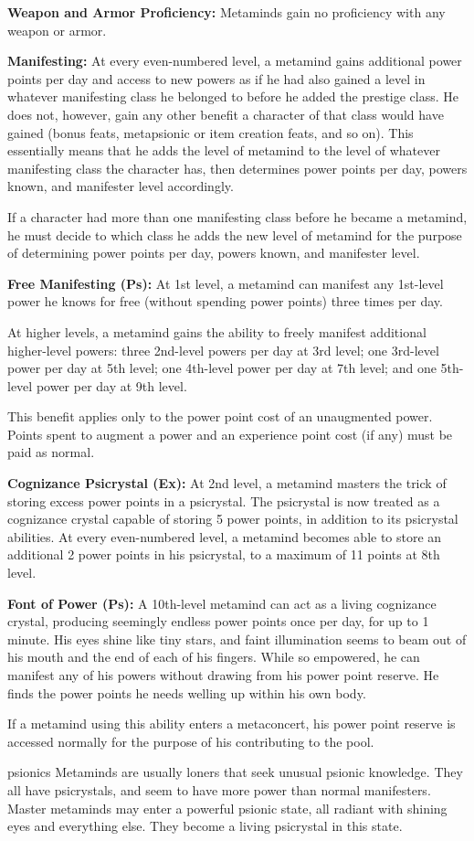 {
\textbf{Weapon and Armor Proficiency:} Metaminds gain no proficiency with any weapon or armor.

\textbf{Manifesting:} At every even-numbered level, a metamind gains additional power points per day and access to new powers as if he had also gained a level in whatever manifesting class he belonged to before he added the prestige class. He does not, however, gain any other benefit a character of that class would have gained (bonus feats, metapsionic or item creation feats, and so on). This essentially means that he adds the level of metamind to the level of whatever manifesting class the character has, then determines power points per day, powers known, and manifester level accordingly.

If a character had more than one manifesting class before he became a metamind, he must decide to which class he adds the new level of metamind for the purpose of determining power points per day, powers known, and manifester level.

\textbf{Free Manifesting (Ps):} At 1st level, a metamind can manifest any 1st-level power he knows for free (without spending power points) three times per day.

At higher levels, a metamind gains the ability to freely manifest additional higher-level powers: three 2nd-level powers per day at 3rd level; one 3rd-level power per day at 5th level; one 4th-level power per day at 7th level; and one 5th-level power per day at 9th level.

This benefit applies only to the power point cost of an unaugmented power. Points spent to augment a power and an experience point cost (if any) must be paid as normal.

\textbf{Cognizance Psicrystal (Ex):} At 2nd level, a metamind masters the trick of storing excess power points in a psicrystal. The psicrystal is now treated as a cognizance crystal capable of storing 5 power points, in addition to its psicrystal abilities. At every even-numbered level, a metamind becomes able to store an additional 2 power points in his psicrystal, to a maximum of 11 points at 8th level.

\textbf{Font of Power (Ps):} A 10th-level metamind can act as a living cognizance crystal, producing seemingly endless power points once per day, for up to 1 minute. His eyes shine like tiny stars, and faint illumination seems to beam out of his mouth and the end of each of his fingers. While so empowered, he can manifest any of his powers without drawing from his power point reserve. He finds the power points he needs welling up within his own body.

If a metamind using this ability enters a metaconcert, his power point reserve is accessed normally for the purpose of his contributing to the pool.
}
{}
{psionics}
{Metaminds are usually loners that seek unusual psionic knowledge.}
{They all have psicrystals, and seem to have more power than normal manifesters.}
{Master metaminds may enter a powerful psionic state, all radiant with shining eyes and everything else. They become a living psicrystal in this state.}
